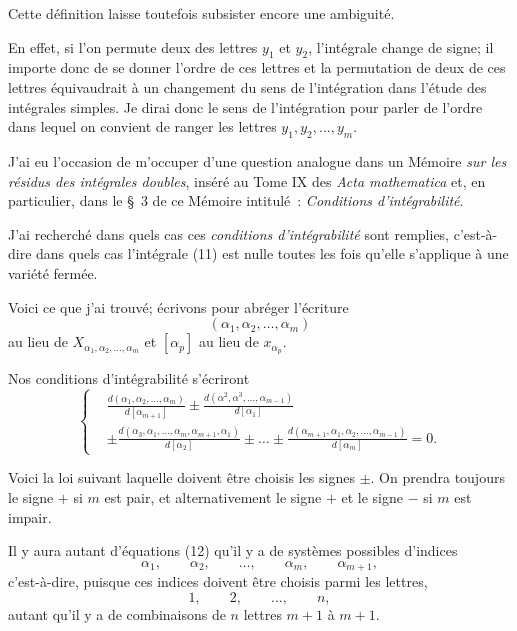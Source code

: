 \documentclass{article}
\begin{document}
Cette définition laisse toutefois subsister encore une ambiguité.

En effet, si l'on permute deux des lettres $y_{1}$ et $y_{2}$, l'intégrale change de signe; il importe donc de se donner l'ordre de ces lettres et la permutation de deux de ces lettres équivaudrait à un changement du sens de l'intégration dans l'étude des intégrales simples. Je dirai donc le sens de l'intégration pour parler de l'ordre dans lequel on convient de ranger les lettres $y_{1}, y_{2}, \ldots, y_{m}$.

J'ai eu l'occasion de m'occuper d'une question analogue dans un Mémoire \emph{sur les résidus des intégrales doubles}, inséré au Tome IX des \emph{Acta mathematica} et, en particulier, dans le \S~3 de ce Mémoire intitulé~: \emph{Conditions d'intégrabilité}.

J'ai recherché dans quels cas ces \emph{conditions d'intégrabilité} sont remplies, c'est-à-dire dans quels cas l'intégrale (11) est nulle toutes les fois qu'elle s'applique à une variété fermée.

Voici ce que j'ai trouvé; écrivons pour abréger l'écriture
\[
(\alpha_{1}, \alpha_{2}, \ldots, \alpha_{m})
\]
au lieu de $X_{\alpha_{1}, \alpha_{2}, \ldots, \alpha_{m}}$ et $[\alpha_{p}]$ au lieu de $x_{\alpha_{p}}$.

Nos conditions d'intégrabilité s'écriront
\[
\left\{
\begin{aligned}
&\frac{d(\alpha_{1}, \alpha_{2}, \ldots, \alpha_{m})}{d[\alpha_{m+1}]} \pm \frac{d(\alpha^{2}, \alpha^{3}, \ldots, \alpha_{m-1})}{d[\alpha_{1}]}\\
&\pm \frac{d(\alpha_{3}, \alpha_{1}, \ldots, \alpha_{m}, \alpha_{m+1}, \alpha_{1})}{d[\alpha_{2}]} \pm \ldots \pm \frac{d(\alpha_{m+1}, \alpha_{1}, \alpha_{2}, \ldots, \alpha_{m-1})}{d[\alpha_{m}]} = 0.
\end{aligned}
\right. \tag{12}
\]

Voici la loi suivant laquelle doivent être choisis les signes $\pm$. On prendra toujours le signe $+$ si $m$ est pair, et alternativement le signe $+$ et le signe $-$ si $m$ est impair.

Il y aura autant d'équations (12) qu'il y a de systèmes possibles d'indices
\[
\alpha_{1}, \qquad \alpha_{2}, \qquad \ldots, \qquad \alpha_{m}, \qquad \alpha_{m+1},
\]
c'est-à-dire, puisque ces indices doivent être choisis parmi les lettres,
\[
1, \qquad 2, \qquad \ldots, \qquad n,
\]
autant qu'il y a de combinaisons de $n$ lettres $m + 1$ à $m + 1$.
\end{document}
